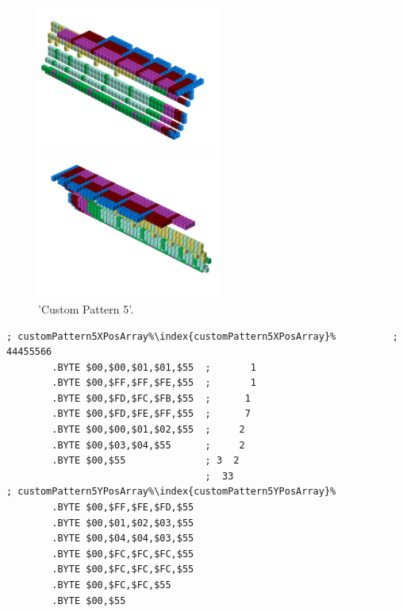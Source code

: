 \begin{minipage}[b]{0.48\linewidth}
\begin{figure}[H]
    \centering
    \begin{adjustbox}{width=6cm,margin=0cm 0cm}
      \includegraphics[width=6cm]{src/patterns/pattern13-45.png}%
    \end{adjustbox}
    \begin{adjustbox}{width=6cm,margin=0cm -1.8cm}
      \includegraphics[width=6cm]{src/patterns/pattern13-225.png}%
    \end{adjustbox}
\caption{'Custom Pattern 5'.}
\end{figure}
\end{minipage}
\begin{minipage}[b]{0.48\linewidth}
\begin{lrbox}{\mybox}%
\begin{lstlisting}[basicstyle=\ttfamily\tiny,escapechar=\%]
; customPattern5XPosArray%\index{customPattern5XPosArray}%          ;   44455566
        .BYTE $00,$00,$01,$01,$55  ;       1   
        .BYTE $00,$FF,$FF,$FE,$55  ;       1   
        .BYTE $00,$FD,$FC,$FB,$55  ;      1    
        .BYTE $00,$FD,$FE,$FF,$55  ;      7    
        .BYTE $00,$00,$01,$02,$55  ;     2     
        .BYTE $00,$03,$04,$55      ;     2     
        .BYTE $00,$55              ; 3  2      
                                   ;  33       
; customPattern5YPosArray%\index{customPattern5YPosArray}%
        .BYTE $00,$FF,$FE,$FD,$55
        .BYTE $00,$01,$02,$03,$55
        .BYTE $00,$04,$04,$03,$55
        .BYTE $00,$FC,$FC,$FC,$55
        .BYTE $00,$FC,$FC,$FC,$55
        .BYTE $00,$FC,$FC,$55
        .BYTE $00,$55
\end{lstlisting}
\end{lrbox}%
\scalebox{0.8}{\usebox{\mybox}}

\end{minipage}
